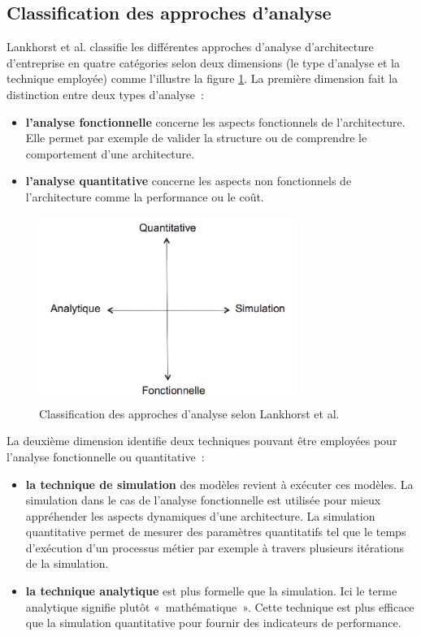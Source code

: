	\subsection{Classification des approches d'analyse}
Lankhorst et al. \cite{lankhorst2013enterprise} classifie les différentes approches d'analyse d'architecture d'entreprise en quatre catégories selon deux dimensions (le type d'analyse et la technique employée) comme l'illustre la figure \ref{fig:classLankhorst}. La première dimension fait la distinction entre deux types d'analyse~:
	\begin{itemize}
		\item \textbf{l'analyse fonctionnelle} concerne les aspects fonctionnels de l'architecture. Elle permet par exemple de valider la structure ou de comprendre le comportement d'une architecture.
		\item \textbf{l'analyse quantitative} concerne les aspects non fonctionnels de l'architecture comme la performance ou le coût. 
\end{itemize}

\begin{figure}[!htbp]
 \begin{center}
  \includegraphics[width=0.75\textwidth]{figures/images/Chapitre1/dimesionsLankhorts.png}
 \end{center}
 \caption{Classification des approches d'analyse selon Lankhorst et al. \protect\cite{lankhorst2013enterprise}}
 \label{fig:classLankhorst}
\end{figure}

La deuxième dimension identifie deux techniques pouvant être employées pour l'analyse fonctionnelle ou quantitative~:
	\begin{itemize}
		\item \textbf{la technique de simulation} des modèles revient à exécuter ces modèles. La simulation dans le cas de l'analyse fonctionnelle est utilisée pour mieux appréhender les aspects dynamiques d'une architecture. La simulation quantitative permet de mesurer des paramètres quantitatifs tel que le temps d'exécution d'un processus métier par exemple à travers plusieurs itérations de la simulation. 
		\item \textbf{la technique analytique} est plus formelle que la simulation. Ici le terme analytique signifie plutôt «~mathématique~». Cette technique est plus efficace que la simulation quantitative pour fournir des indicateurs de performance.  
	\end{itemize}
	

